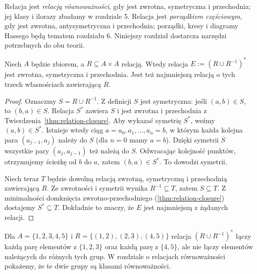 \begin{uwaga}
Relacja jest \emph{relacją równoważności}, gdy jest
zwrotna, symetryczna i przechodnia; jej klasy i ilorazy
zbadamy w rozdziale 5. Relacja jest \emph{porządkiem
częściowym}, gdy jest zwrotna, antysymetryczna i przechodnia;
porządki, kresy i diagramy Hassego będą tematem rozdziału 6.
Niniejszy rozdział dostarcza narzędzi potrzebnych do obu teorii.
\end{uwaga}

\begin{twierdzenie}
\label{thm:equiv-generated-prelim}
Niech $A$ będzie zbiorem, a $R\subseteq A\times A$ relacją.
Wtedy relacja $E:=(R\cup R^{-1})^*$ jest zwrotna, symetryczna
i przechodnia. Jest też najmniejszą relacją o tych trzech
własnościach zawierającą $R$.
\end{twierdzenie}
\begin{proof}
Oznaczmy $S=R\cup R^{-1}$. Z definicji $S$ jest symetryczna:
jeśli $(a,b)\in S$, to $(b,a)\in S$. Relacja $S^*$ zawiera $S$
i jest zwrotna i przechodnia z
Twierdzenia~\ref{thm:relation-closure}. Aby wykazać symetrię $S^*$,
weźmy $(a,b)\in S^*$. Istnieje wtedy ciąg
$a=a_0,a_1,\ldots,a_n=b$, w którym każda kolejna para
$(a_{j-1},a_j)$ należy do $S$ (dla $n=0$ mamy $a=b$).
Dzięki symetrii $S$ wszystkie pary
$(a_j,a_{j-1})$ też należą do $S$. Odwracając kolejność
punktów, otrzymujemy ścieżkę od $b$ do $a$, zatem
$(b,a)\in S^*$. To dowodzi symetrii.

Niech teraz $T$ będzie dowolną relacją zwrotną, symetryczną
i przechodnią zawierającą $R$. Ze zwrotności i symetrii wynika
$R^{-1}\subseteq T$, zatem $S\subseteq T$.
Z minimalności domknięcia zwrotno-przechodniego
(\ref{thm:relation-closure}) dostajemy $S^*\subseteq T$.
Dokładnie to znaczy, że $E$ jest najmniejszą z żądanych relacji.
\end{proof}

\begin{przyklad}
Dla $A=\{1,2,3,4,5\}$ i $R=\{(1,2),(2,3),(4,5)\}$
relacja $(R\cup R^{-1})^*$ łączy każdą parę elementów z
$\{1,2,3\}$ oraz każdą parę z $\{4,5\}$, ale nie łączy
elementów należących do różnych tych grup.
W rozdziale o relacjach równoważności pokażemy,
że te dwie grupy są klasami równoważności.
\end{przyklad}

\begin{center}
\end{center}



